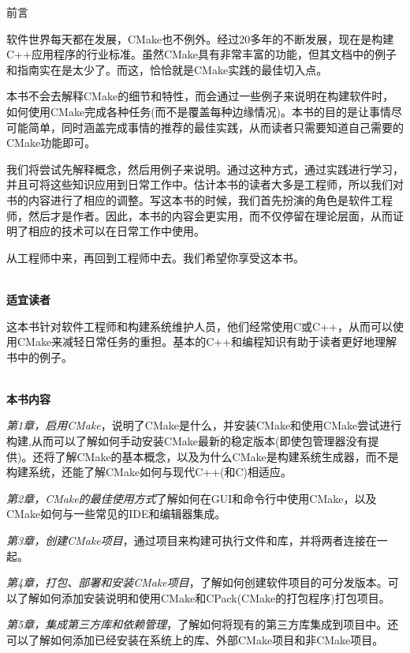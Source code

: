 \begin{flushright}
	 前言
\end{flushright}

软件世界每天都在发展，CMake也不例外。经过20多年的不断发展，现在是构建C++应用程序的行业标准。虽然CMake具有非常丰富的功能，但其文档中的例子和指南实在是太少了。而这，恰恰就是CMake实践的最佳切入点。

本书不会去解释CMake的细节和特性，而会通过一些例子来说明在构建软件时，如何使用CMake完成各种任务(而不是覆盖每种边缘情况)。本书的目的是让事情尽可能简单，同时涵盖完成事情的推荐的最佳实践，从而读者只需要知道自己需要的CMake功能即可。

我们将尝试先解释概念，然后用例子来说明。通过这种方式，通过实践进行学习，并且可将这些知识应用到日常工作中。估计本书的读者大多是工程师，所以我们对书的内容进行了相应的调整。写这本书的时候，我们首先扮演的角色是软件工程师，然后才是作者。因此，本书的内容会更实用，而不仅停留在理论层面，从而证明了相应的技术可以在日常工作中使用。

从工程师中来，再回到工程师中去。我们希望你享受这本书。

\hspace*{\fill} \\ %
\textbf{适宜读者}

这本书针对软件工程师和构建系统维护人员，他们经常使用C或C++，从而可以使用CMake来减轻日常任务的重担。基本的C++和编程知识有助于读者更好地理解书中的例子。

\hspace*{\fill} \\ %
\textbf{本书内容}

\textit{第1章，启用CMake}，说明了CMake是什么，并安装CMake和使用CMake尝试进行构建,从而可以了解如何手动安装CMake最新的稳定版本(即使包管理器没有提供)。还将了解CMake的基本概念，以及为什么CMake是构建系统生成器，而不是构建系统，还能了解CMake如何与现代C++(和C)相适应。

\textit{第2章，CMake的最佳使用方式}了解如何在GUI和命令行中使用CMake，以及CMake如何与一些常见的IDE和编辑器集成。

\textit{第3章，创建CMake项目}，通过项目来构建可执行文件和库，并将两者连接在一起。

\textit{第4章，打包、部署和安装CMake项目}，了解如何创建软件项目的可分发版本。可以了解如何添加安装说明和使用CMake和CPack(CMake的打包程序)打包项目。

\textit{第5章，集成第三方库和依赖管理}，了解如何将现有的第三方库集成到项目中。还可以了解如何添加已经安装在系统上的库、外部CMake项目和非CMake项目。

